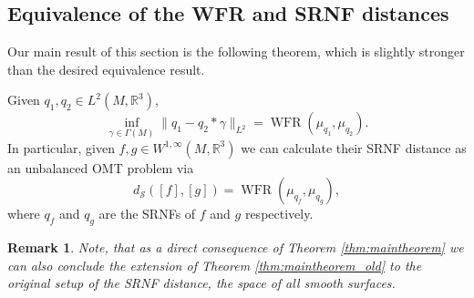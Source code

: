 \documentclass[final,hidelinks,onefignum,onetabnum]{siamart220329}
\newtheorem{remark}{Remark}
\newcommand{\R}{\mathbb{R}}
\newcommand{\WFR}{\operatorname{WFR}}
\begin{document}
\subsection{Equivalence of the WFR and SRNF distances}
Our main result of this section is the following theorem, which is slightly stronger than the desired equivalence result. 
\begin{theorem}\label{thm:maintheorem}
Given $q_1,q_2\in L^2(M,\R^3)$,
\[\inf_{\gamma\in \Gamma(M)}\|q_1-q_2*\gamma\|_{L^2}=\WFR(\mu_{q_1},\mu_{q_2}).\]
In particular, given 
$f,g\in W^{1,\infty}(M,\R^3)$ we can calculate their SRNF distance as an unbalanced OMT problem via
\begin{equation*}
    d_{\mathcal S}([f],[g])=\WFR(\mu_{q_f},\mu_{q_g}),
\end{equation*}
where $q_f$ and $q_g$ are the SRNFs of $f$ and $g$ respectively.
\end{theorem}
\begin{remark}
Note, that as a direct consequence of Theorem \ref{thm:maintheorem} we can also conclude the extension of Theorem \ref{thm:maintheorem_old} to the original setup of the SRNF distance, the space of all smooth surfaces. 
\end{remark}
\end{document}
